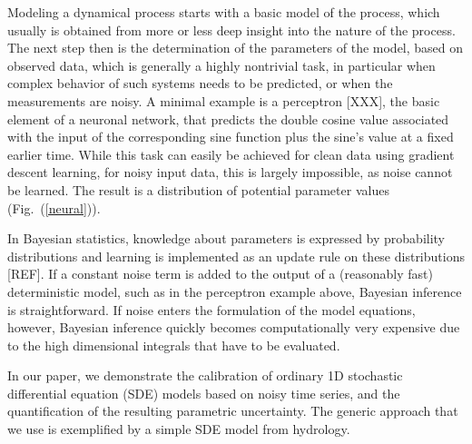 \documentclass[11pt]{article}
\theoremstyle{definition}
\begin{document}
Modeling a dynamical process starts with a basic model of the process, which usually is obtained from more or less deep insight into the nature of the process. The next step then is the determination of the parameters of the model, based on observed data, which is generally a highly nontrivial task, in particular when complex behavior of such systems needs to be predicted, or when the measurements are noisy. 
A minimal example is a perceptron [XXX], the basic element of a neuronal network, that predicts the double cosine value associated with the input of the corresponding sine function plus the sine's value at a fixed earlier time. While this task can easily be achieved for clean data using gradient descent learning, for noisy input data, this is largely impossible, as noise cannot be learned. The result is a distribution of potential parameter values (Fig.~(\ref{neural})).

In Bayesian statistics, knowledge about parameters is expressed by probability distributions and learning is implemented as an update rule on these distributions [REF]. 
If a constant noise term is added to the output of a (reasonably fast) deterministic model, such as in the perceptron example above, Bayesian inference is straightforward.
If noise enters the formulation of the model equations, however, Bayesian inference quickly becomes computationally very expensive due to the high dimensional integrals that have to be evaluated.

In our paper, we demonstrate the calibration of ordinary 1D stochastic differential equation (SDE) models based on noisy time series, and the quantification of the resulting parametric uncertainty. The generic approach that we use is exemplified by a simple SDE model from hydrology.
\end{document}
